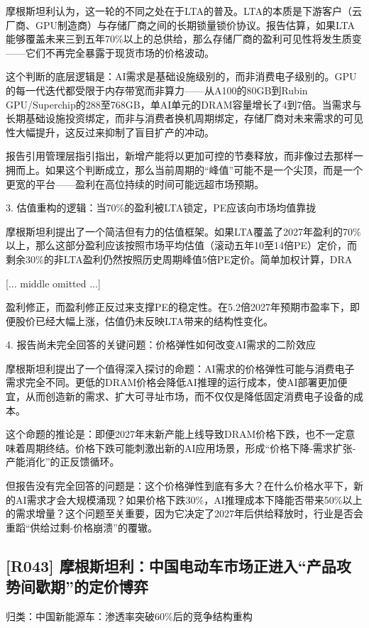 \documentclass[11pt]{ctexart}
\begin{document}
摩根斯坦利认为，这一轮的不同之处在于LTA的普及。LTA的本质是下游客户（云厂商、GPU制造商）与存储厂商之间的长期锁量锁价协议。报告估算，如果LTA能够覆盖未来三到五年70\%以上的总供给，那么存储厂商的盈利可见性将发生质变——它们不再完全暴露于现货市场的价格波动。

这个判断的底层逻辑是：AI需求是基础设施级别的，而非消费电子级别的。GPU的每一代迭代都受限于内存带宽而非算力——从A100的80GB到Rubin GPU/Superchip的288至768GB，单AI单元的DRAM容量增长了4到7倍。当需求与长期基础设施投资绑定，而非与消费者换机周期绑定，存储厂商对未来需求的可见性大幅提升，这反过来抑制了盲目扩产的冲动。

报告引用管理层指引指出，新增产能将以更加可控的节奏释放，而非像过去那样一拥而上。如果这个判断成立，那么当前周期的“峰值”可能不是一个尖顶，而是一个更宽的平台——盈利在高位持续的时间可能远超市场预期。

3. 估值重构的逻辑：当70\%的盈利被LTA锁定，PE应该向市场均值靠拢

摩根斯坦利提出了一个简洁但有力的估值框架。如果LTA覆盖了2027年盈利的70\%以上，那么这部分盈利应该按照市场平均估值（滚动五年10至14倍PE）定价，而剩余30\%的非LTA盈利仍然按照历史周期峰值5倍PE定价。简单加权计算，DRA

[... middle omitted ...]

盈利修正，而盈利修正反过来支撑PE的稳定性。在5.2倍2027年预期市盈率下，即便股价已经大幅上涨，估值仍未反映LTA带来的结构性变化。

4. 报告尚未完全回答的关键问题：价格弹性如何改变AI需求的二阶效应

摩根斯坦利提出了一个值得深入探讨的命题：AI需求的价格弹性可能与消费电子需求完全不同。更低的DRAM价格会降低AI推理的运行成本，使AI部署更加便宜，从而创造新的需求、扩大可寻址市场，而不仅仅是降低固定消费电子设备的成本。

这个命题的推论是：即便2027年末新产能上线导致DRAM价格下跌，也不一定意味着周期终结。价格下跌可能刺激出新的AI应用场景，形成“价格下降-需求扩张-产能消化”的正反馈循环。

但报告没有完全回答的问题是：这个价格弹性到底有多大？在什么价格水平下，新的AI需求才会大规模涌现？如果价格下跌30\%，AI推理成本下降能否带来50\%以上的需求增量？这个问题至关重要，因为它决定了2027年后供给释放时，行业是否会重蹈“供给过剩-价格崩溃”的覆辙。

\subsection{[R043] 摩根斯坦利：中国电动车市场正进入“产品攻势间歇期”的定价博弈}
{\small\color{refgray}归类：中国新能源车：渗透率突破60\%后的竞争结构重构}
\end{document}
